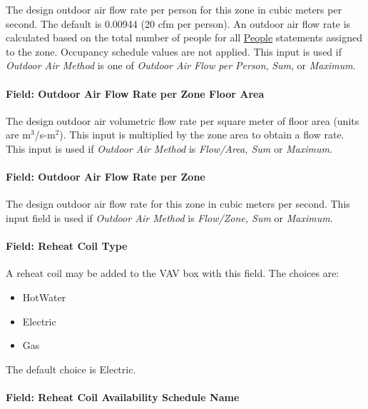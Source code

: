 The design outdoor air flow rate per person for this zone in cubic meters per second. The default is 0.00944 (20 cfm per person). An outdoor air flow rate is calculated based on the total number of people for all \hyperref[people]{People} statements assigned to the zone. Occupancy schedule values are not applied. This input is used if \emph{Outdoor Air Method} is one of \emph{Outdoor Air Flow per Person}, \emph{Sum}, or \emph{Maximum}.

\paragraph{Field: Outdoor Air Flow Rate per Zone Floor Area}\label{field-outdoor-air-flow-rate-per-zone-floor-area-9}

The design outdoor air volumetric flow rate per square meter of floor area (units are m\(^{3}\)/s-m\(^{2}\)). This input is multiplied by the zone area to obtain a flow rate. This input is used if \emph{Outdoor Air Method} is \emph{Flow/Area, Sum} or \emph{Maximum}.

\paragraph{Field: Outdoor Air Flow Rate per Zone}\label{field-outdoor-air-flow-rate-per-zone-9}

The design outdoor air flow rate for this zone in cubic meters per second. This input field is used if \emph{Outdoor Air Method} is \emph{Flow/Zone, Sum} or \emph{Maximum}.

\paragraph{Field: Reheat Coil Type}\label{field-reheat-coil-type-1}

A reheat coil may be added to the VAV box with this field. The choices are:

\begin{itemize}
\item
  HotWater
\item
  Electric
\item
  Gas
\end{itemize}

The default choice is Electric.

\paragraph{Field: Reheat Coil Availability Schedule Name}\label{field-reheat-coil-availability-schedule-name-1}

